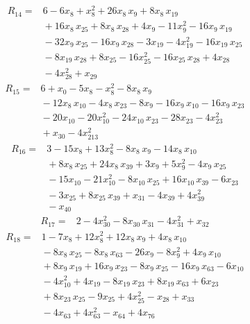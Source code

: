 \documentclass[11pt]{article}
\begin{document}
\begin{equation*}\begin{aligned}
R_{14}={}&6 - 6x_{8} + x_{8}^{2} + 26x_{8}\,x_{9} + 8x_{8}\,x_{19} \\
&{} + 16x_{8}\,x_{25} + 8x_{8}\,x_{28} + 4x_{9} - 11x_{9}^{2} - 16x_{9}\,x_{19} \\
&{} - 32x_{9}\,x_{25} - 16x_{9}\,x_{28} - 3x_{19} - 4x_{19}^{2} - 16x_{19}\,x_{25} \\
&{} - 8x_{19}\,x_{28} + 8x_{25} - 16x_{25}^{2} - 16x_{25}\,x_{28} + 4x_{28} \\
&{} - 4x_{28}^{2} + x_{29}
\end{aligned}\end{equation*}
\begin{equation*}\begin{aligned}
R_{15}={}&6 + x_{0} - 5x_{8} - x_{8}^{2} - 8x_{8}\,x_{9} \\
&{} - 12x_{8}\,x_{10} - 4x_{8}\,x_{23} - 8x_{9} - 16x_{9}\,x_{10} - 16x_{9}\,x_{23} \\
&{} - 20x_{10} - 20x_{10}^{2} - 24x_{10}\,x_{23} - 28x_{23} - 4x_{23}^{2} \\
&{} + x_{30} - 4x_{213}^{2}
\end{aligned}\end{equation*}
\begin{equation*}\begin{aligned}
R_{16}={}&3 - 15x_{8} + 13x_{8}^{2} - 8x_{8}\,x_{9} - 14x_{8}\,x_{10} \\
&{} + 8x_{8}\,x_{25} + 24x_{8}\,x_{39} + 3x_{9} + 5x_{9}^{2} - 4x_{9}\,x_{25} \\
&{} - 15x_{10} - 21x_{10}^{2} - 8x_{10}\,x_{25} + 16x_{10}\,x_{39} - 6x_{23} \\
&{} - 3x_{25} + 8x_{25}\,x_{39} + x_{31} - 4x_{39} + 4x_{39}^{2} \\
&{} - x_{40}
\end{aligned}\end{equation*}
\begin{equation*}\begin{aligned}
R_{17}={}&2 - 4x_{30}^{2} - 8x_{30}\,x_{31} - 4x_{31}^{2} + x_{32}
\end{aligned}\end{equation*}
\begin{equation*}\begin{aligned}
R_{18}={}&1 - 7x_{8} + 12x_{8}^{2} + 12x_{8}\,x_{9} + 4x_{8}\,x_{10} \\
&{} - 8x_{8}\,x_{25} - 8x_{8}\,x_{63} - 26x_{9} - 8x_{9}^{2} + 4x_{9}\,x_{10} \\
&{} + 8x_{9}\,x_{19} + 16x_{9}\,x_{23} - 8x_{9}\,x_{25} - 16x_{9}\,x_{63} - 6x_{10} \\
&{} - 4x_{10}^{2} + 4x_{19} - 8x_{19}\,x_{23} + 8x_{19}\,x_{63} + 6x_{23} \\
&{} + 8x_{23}\,x_{25} - 9x_{25} + 4x_{25}^{2} - x_{28} + x_{33} \\
&{} - 4x_{63} + 4x_{63}^{2} - x_{64} + 4x_{76}
\end{aligned}\end{equation*}
\end{document}

